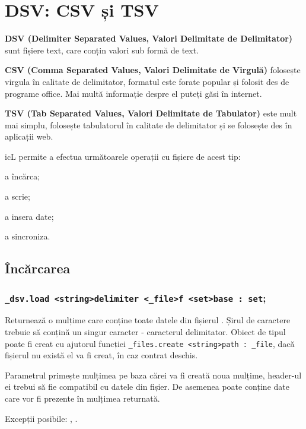 \section{DSV: CSV și TSV}

{\bf DSV (Delimiter Separated Values, Valori Delimitate de Delimitator)} sunt fișiere text, care conțin valori sub formă de text.

{\bf CSV (Comma Separated Values, Valori Delimitate de Virgulă)} folosește virgula în calitate de delimitator, formatul este forate popular și folosit des de programe office. Mai multă informație despre el puteți găsi în internet.

{\bf TSV (Tab Separated Values, Valori Delimitate de Tabulator)} este mult mai simplu, folosește tabulatorul în calitate de delimitator și se folosește des în aplicații web.

icL permite a efectua următoarele operații cu fișiere de acest tip:
\begin{icItems}
	\item a încărca;
	\item a scrie;
	\item a insera date;
	\item a sincroniza.
\end{icItems}

\subsection{Încărcarea}

\subsubsection{\lstinline|_dsv.load <string>delimiter <_file>f <set>base : set|;}

Returnează o mulțime care conține toate datele din fișierul . Șirul de caractere  trebuie să conțină un singur caracter - caracterul delimitator. Obiect de tipul  poate fi creat cu ajutorul funcției \lstinline|_files.create <string>path : _file|, dacă fișierul nu există el va fi creat, în caz contrat deschis.

Parametrul  primește mulțimea pe baza cărei va fi creată noua mulțime, header-ul ei trebui să fie compatibil cu datele din fișier. De asemenea poate conține date care vor fi prezente în mulțimea returnată.

Excepții posibile: , .

